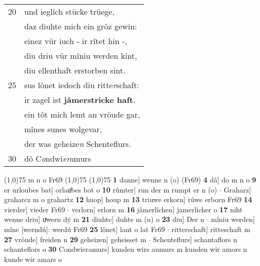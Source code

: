 \documentclass[8pt,a4paper,notitlepage]{article}
\begin{document}
\begin{table}[ht]
\begin{minipage}[t]{0.5\linewidth}
\begin{tabular}{rl}
20 & und ieglîch stücke trüege,\\ 
 & daz diuhte mich ein grôz gewin:\\ 
 & einez vür iuch - ir rîtet hin -,\\ 
 & diu driu vür mîniu werden kint,\\ 
 & diu ellenthaft erstorben sint.\\ 
25 & sus lônet iedoch diu ritte\textit{r}schaft:\\ 
 & ir zagel ist \textbf{jâmerstricke haft}.\\ 
 & ein tôt mich lemt an vröude gar,\\ 
 & mînes sunes wolgevar,\\ 
 & der was geheize\textit{n} Schenteflurs.\\ 
30 & dô C\textit{o}ndwi\textit{era}murs\\ 
\end{tabular}
\scriptsize
\line(1,0){75} \newline
m n o Fr69 \newline
\line(1,0){75} \newline
\newline
\line(1,0){75} \newline
\textbf{1} danne] wenne n (o) (Fr69) \textbf{4} dâ] do m n o \textbf{9} er urloubes bat] orlauͦbes bot o \textbf{10} rûmter] run der m rumpt er n (o)  $\cdot$ Graharz] graharcz m o grahartz \textbf{12} huop] houp m \textbf{13} triuwe erkorn] rúwe erborn Fr69 \textbf{14} vierder] vieder Fr69  $\cdot$ verlorn] erlorn m \textbf{16} jâmerlîchen] jamerlicher o \textbf{17} niht wenne driu] uͯwern dẏ m \textbf{21} diuhte] duhte m (n) o \textbf{23} diu] Der n  $\cdot$ mîniu werden] mîne [werndú]: werdú Fr69 \textbf{25} lônet] lant o lat Fr69  $\cdot$ ritterschaft] ritteschaft m \textbf{27} vröude] freiden n \textbf{29} geheizen] geheisset m  $\cdot$ Schenteflurs] schantaflors n schanteflors o \textbf{30} Condwieramurs] kunden wirs aumurs m kunden wir amors n kunde wir amars o \newline
\end{minipage}
\end{table}
\newpage
\end{document}
